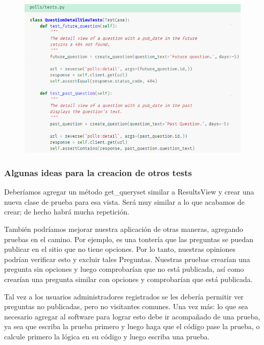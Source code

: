 \documentclass[10pt]{article}
\begin{document}
\begin{figure}[H]
\begin{center}
\includegraphics[scale=1]{figuras/3/35/357/img10.png}
\end{center}
\end{figure}

\subsubsection{Algunas ideas para la creacion de otros tests}
Deberíamos agregar un método \textcolor{G}{get\_queryset} similar a \textcolor{G}{ResultsView} y crear una nueva clase de prueba para esa vista. Será muy similar a lo que acabamos de crear; de hecho habrá mucha repetición.

También podríamos mejorar nuestra aplicación de otras maneras, agregando pruebas en el camino. Por ejemplo, es una tontería que las preguntas se puedan publicar en el sitio que no tiene opciones. Por lo tanto, nuestras opiniones podrían verificar esto y excluir tales Preguntas. Nuestras pruebas crearían una pregunta sin opciones y luego comprobarían que no está publicada, así como crearían una pregunta similar con opciones y comprobarían que está publicada.

Tal vez a los usuarios administradores registrados se les debería permitir ver preguntas no publicadas, pero no visitantes comunes. Una vez más: lo que sea necesario agregar al software para lograr esto debe ir acompañado de una prueba, ya sea que escriba la prueba primero y luego haga que el código pase la prueba, o calcule primero la lógica en su código y luego escriba una prueba.
\end{document}
